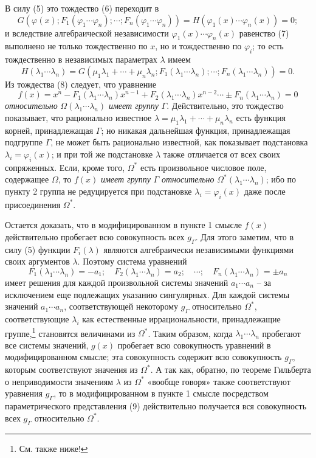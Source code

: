 \documentclass[11pt]{article}
\begin{document}
В силу (5) это тождество (6) переходит в
\begin{equation}
G(\varphi(x);F_1(\varphi_1\cdots\varphi_n);\cdots;F_n(\varphi_1\cdots\varphi_n))
=H(\varphi_1(x)\cdots\varphi_n(x))=0;
\tag{7}
\end{equation}
и вследствие алгебраической независимости $\varphi_1(x)\cdots\varphi_n(x)$ равенство (7) выполнено не только тождественно по $x$, но и тождественно по $\varphi_i$; то есть тождественно в независимых параметрах $\lambda$ имеем
\begin{equation}
H(\lambda_1\cdots\lambda_n)=G(\mu_1\lambda_1+\cdots+\mu_n\lambda_n;F_1(\lambda_1\cdots\lambda_n);\cdots;F_n(\lambda_1\cdots\lambda_n))=0.
\tag{8}
\end{equation}
Из тождества (8) следует, что уравнение
\begin{equation}
f(x)=x^n-F_1(\lambda_1\cdots\lambda_n)x^{n-1}+F_2(\lambda_1\cdots\lambda_n)x^{n-2}\cdots\pm F_n(\lambda_1\cdots\lambda_n)=0
\tag{9}
\end{equation}
\emph{относительно} $\Omega(\lambda_1\cdots\lambda_n)$ \emph{имеет группу} $\Gamma$. Действительно, это тождество показывает, что рационально известное $\lambda=\mu_1\lambda_1+\cdots+\mu_n\lambda_n$ есть функция корней, принадлежащая $\Gamma$; но никакая дальнейшая функция, принадлежащая подгруппе $\Gamma$, не может быть рационально известной, как показывает подстановка $\lambda_i=\varphi_i(x)$; и при той же подстановке $\lambda$ также отличается от всех своих сопряженных. Если, кроме того, $\Omega^*$ есть произвольное числовое поле, содержащее $\Omega$, то $f(x)$ \emph{имеет группу} $\Gamma$ \emph{относительно} $\Omega^*(\lambda_1\cdots\lambda_n)$; ибо по пункту 2 группа не редуцируется при подстановке $\lambda_i=\varphi_i(x)$ даже после присоединения $\Omega^*$.

Остается доказать, что в модифицированном в пункте 1 смысле $f(x)$ действительно пробегает всю совокупность всех $g_\Gamma$. Для этого заметим, что в силу (5) функции $F_i(\lambda)$ являются алгебраически независимыми функциями своих аргументов $\lambda$. Поэтому система уравнений
\begin{equation}
F_1(\lambda_1\cdots\lambda_n)=-a_1;\quad F_2(\lambda_1\cdots\lambda_n)=a_2;\quad \cdots;\quad F_n(\lambda_1\cdots\lambda_n)=\pm a_n
\tag{10}
\end{equation}
имеет решения для каждой произвольной системы значений $a_1\cdots a_n$ -- за исключением еще подлежащих указанию сингулярных. Для каждой системы значений $a_1\cdots a_n$, соответствующей некоторому $g_\Gamma$ относительно $\Omega^*$, соответствующие $\lambda_i$ как естественные иррациональности, принадлежащие группе,\footnote{См. также ниже!} становятся величинами из $\Omega^*$. Таким образом, когда $\lambda_1\cdots\lambda_n$ пробегают все системы значений, $g(x)$ пробегает всю совокупность уравнений в модифицированном смысле; эта совокупность содержит всю совокупность $g_\Gamma$, которым соответствуют значения из $\Omega^*$. А так как, обратно, по теореме Гильберта о неприводимости значениям $\lambda$ из $\Omega^*$ «вообще говоря» также соответствуют уравнения $g_\Gamma$, то в модифицированном в пункте 1 смысле посредством параметрического представления (9) действительно получается вся совокупность всех $g_\Gamma$ относительно $\Omega^*$.
\end{document}
